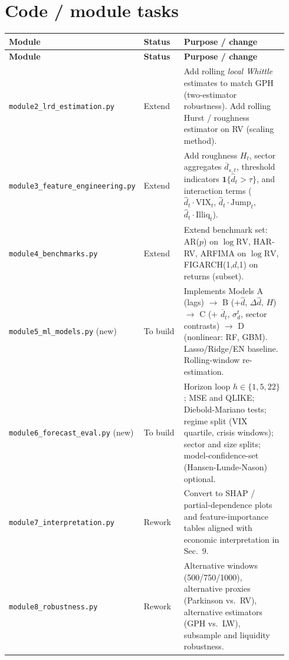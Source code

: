 \documentclass[11pt,a4paper]{article}
\begin{document}
\section{Code / module tasks}\label{sec:code}

\begin{longtable}{@{}p{0.28\linewidth}p{0.16\linewidth}p{0.50\linewidth}@{}}
\toprule
\textbf{Module} & \textbf{Status} & \textbf{Purpose / change} \\
\midrule
\endfirsthead
\toprule
\textbf{Module} & \textbf{Status} & \textbf{Purpose / change} \\
\midrule
\endhead
\texttt{module2\_lrd\_estimation.py} & Extend &
Add rolling \emph{local Whittle} estimates to match GPH (two-estimator
robustness). Add rolling Hurst / roughness estimator on RV (scaling method). \\
\texttt{module3\_feature\_engineering.py} & Extend &
Add roughness $H_t$, sector aggregates $\overline{d}_{s,t}$, threshold
indicators $\mathbf{1}\{\hat d_t>\tau\}$, and interaction terms
($\hat d_t\cdot\mathrm{VIX}_t$, $\hat d_t\cdot\mathrm{Jump}_t$,
$\hat d_t\cdot\mathrm{Illiq}_t$). \\
\texttt{module4\_benchmarks.py} & Extend &
Extend benchmark set: AR($p$) on $\log \mathrm{RV}$, HAR-RV, ARFIMA
on $\log \mathrm{RV}$, FIGARCH(1,$d$,1) on returns (subset). \\
\texttt{module5\_ml\_models.py} (new) & To build &
Implements Models A (lags) $\to$ B (+$\hat d$, $\Delta\hat d$, $H$) $\to$ C
(+ $\overline{d}_t$, $\sigma_d^t$, sector contrasts) $\to$ D (nonlinear:
RF, GBM). Lasso/Ridge/EN baseline. Rolling-window re-estimation. \\
\texttt{module6\_forecast\_eval.py} (new) & To build &
Horizon loop $h\in\{1,5,22\}$; MSE and QLIKE; Diebold-Mariano tests;
regime split (VIX quartile, crisis windows); sector and size splits;
model-confidence-set (Hansen-Lunde-Nason) optional. \\
\texttt{module7\_interpretation.py} & Rework &
Convert to SHAP / partial-dependence plots and feature-importance tables
aligned with economic interpretation in Sec.\ 9. \\
\texttt{module8\_robustness.py} & Rework &
Alternative windows (500/750/1000), alternative proxies (Parkinson vs.\ RV),
alternative estimators (GPH vs.\ LW), subsample and liquidity robustness. \\
\bottomrule
\end{longtable}
\end{document}
